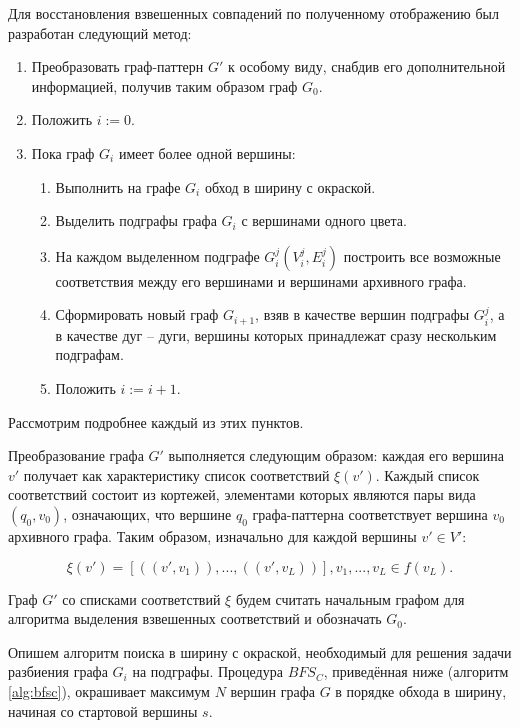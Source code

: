 Для восстановления взвешенных совпадений по полученному отображению был разработан следующий метод:

\begin{enumerate}
	\item Преобразовать граф-паттерн $G'$ к особому виду, снабдив его дополнительной информацией, получив таким образом граф $G_0$.
	\item Положить $i := 0$.
	\item Пока граф $G_i$ имеет более одной вершины:
	\begin{enumerate}
		\item Выполнить на графе $G_i$ обход в ширину с окраской.
		\item Выделить подграфы графа $G_i$ с вершинами одного цвета.
		\item На каждом выделенном подграфе $G_i^j(V_i^j, E_i^j)$ построить все возможные соответствия между его вершинами и вершинами архивного графа.
		\item Сформировать новый граф $G_{i+1}$, взяв в качестве вершин подграфы $G_i^j$, а в качестве дуг -- дуги, вершины которых принадлежат сразу нескольким подграфам.
		\item Положить $i := i + 1$.
	\end{enumerate}
\end{enumerate}

Рассмотрим подробнее каждый из этих пунктов.

Преобразование графа $G'$ выполняется следующим образом: каждая его вершина $v'$ получает как характеристику список соответствий $\xi(v')$. Каждый список соответствий состоит из кортежей, элементами которых являются пары вида $(q_0, v_0)$, означающих, что вершине $q_0$ графа-паттерна соответствует вершина $v_0$ архивного графа. Таким образом, изначально для каждой вершины $v' \in V'$:

\[\xi(v') = [((v', v_1)), ..., ((v', v_L))], v_1, ..., v_L \in f(v_L).\]

Граф $G'$ со списками соответствий $\xi$ будем считать начальным графом для алгоритма выделения взвешенных соответствий и обозначать $G_0$.

Опишем алгоритм поиска в ширину с окраской, необходимый для решения задачи разбиения графа $G_i$ на подграфы. Процедура $BFS_C$, приведённая ниже (алгоритм \ref{alg:bfsc}), окрашивает максимум $N$ вершин графа $G$ в порядке обхода в ширину, начиная со стартовой вершины $s$.

